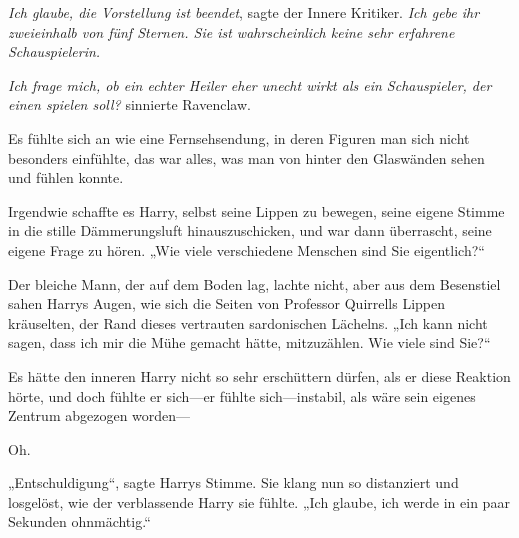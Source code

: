 \emph{Ich glaube, die Vorstellung ist beendet}, sagte der Innere Kritiker. \emph{Ich gebe ihr zweieinhalb von fünf Sternen. Sie ist wahrscheinlich keine sehr erfahrene Schauspielerin.}

\emph{Ich frage mich, ob ein echter Heiler eher unecht wirkt als ein Schauspieler, der einen spielen soll?} sinnierte Ravenclaw.

Es fühlte sich an wie eine Fernsehsendung, in deren Figuren man sich nicht besonders einfühlte, das war alles, was man von hinter den Glaswänden sehen und fühlen konnte.

Irgendwie schaffte es Harry, selbst seine Lippen zu bewegen, seine eigene Stimme in die stille Dämmerungsluft hinauszuschicken, und war dann überrascht, seine eigene Frage zu hören.
„Wie viele verschiedene Menschen sind Sie eigentlich?“

Der bleiche Mann, der auf dem Boden lag, lachte nicht, aber aus dem Besenstiel sahen Harrys Augen, wie sich die Seiten von Professor Quirrells Lippen kräuselten, der Rand dieses vertrauten sardonischen Lächelns.
„Ich kann nicht sagen, dass ich mir die Mühe gemacht hätte, mitzuzählen. Wie viele sind Sie?“

Es hätte den inneren Harry nicht so sehr erschüttern dürfen, als er diese Reaktion hörte, und doch fühlte er sich—er fühlte sich—instabil, als wäre sein eigenes Zentrum abgezogen worden—

Oh.

„Entschuldigung“, sagte Harrys Stimme. Sie klang nun so distanziert und losgelöst, wie der verblassende Harry sie fühlte.
„Ich glaube, ich werde in ein paar Sekunden ohnmächtig.“

